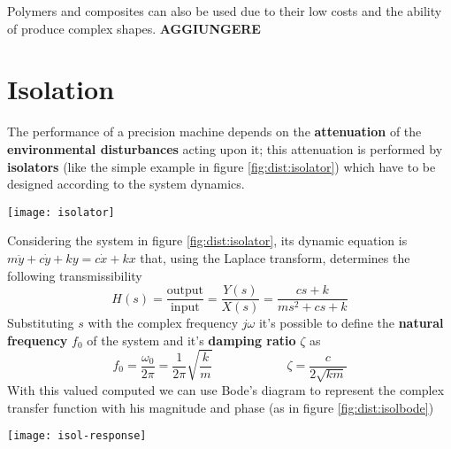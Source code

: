 	Polymers and composites can also be used due to their low costs and the ability of produce complex shapes. \textbf{AGGIUNGERE}
	
	
	
	
	
	
	
	
	
	
	
	
	
	


\section{Isolation}
	
	The performance of a precision machine depends on the \textbf{attenuation} of the \textbf{environmental disturbances} acting upon it; this attenuation is performed by \textbf{isolators} (like the simple example in figure \ref{fig:dist:isolator}) which have to be designed according to the system dynamics.
	
	\begin{SCfigure}[2][bht]
		\centering
		\texttt{[image: isolator]}
		\caption{simple schematic of an isolator element connecting a precision machine to a base frame.} \label{fig:dist:isolator}
	\end{SCfigure}
	
	Considering the system in figure \ref{fig:dist:isolator}, its dynamic equation is $m\ddot y + c\dot y + ky = c\dot x + kx$ that, using the Laplace transform, determines the following transmissibility 
	\begin{equation}
		H(s) = \frac{\text{output}}{\text{input}} =\frac{Y(s)}{X(s)} = \frac{cs + k}{ms^2 + cs +k}
	\end{equation}
	Substituting $s$ with the complex frequency $j\omega$ it's possible to define the \textbf{natural frequency} $f_0$ of the system and it's \textbf{damping ratio} $\zeta$ as
	\begin{equation}
		f_0 = \frac{\omega_0}{2\pi} =  \frac 1 {2\pi}\sqrt{\frac k m}  \qquad \qquad \qquad \zeta= \frac{c}{2\sqrt{km}}
	\end{equation}
	With this valued computed we can use Bode's diagram to represent the complex transfer function with his magnitude and phase (as in figure \ref{fig:dist:isolbode})
	
	\begin{SCfigure}[2][bht]
		\centering \texttt{[image: isol-response]}
		\caption{transmissibility of a simple isolator depending on the damping ration $\zeta$.} \label{fig:dist:isolbode}
	\end{SCfigure}
	
